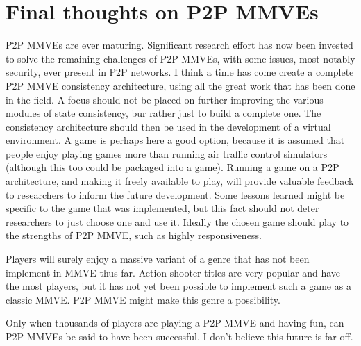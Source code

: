 \section{Final thoughts on P2P MMVEs}

P2P MMVEs are ever maturing. Significant research effort has now been invested to solve the remaining challenges of P2P MMVEs, with some issues, most notably security, ever present in P2P networks. I think a time has come create a complete P2P MMVE consistency architecture, using all the great work that has been done in the field. A focus should not be placed on further improving the various modules of state consistency, bur rather just to build a complete one. 
The consistency architecture should then be used in the development of a virtual environment. A game is perhaps here a good option, because it is assumed that people enjoy playing games more than running air traffic control simulators (although this too could be packaged into a game). Running a game on a P2P architecture, and making it freely available to play, will provide valuable feedback to researchers to inform the future development. Some lessons learned might be specific to the game that was implemented, but this fact should not deter researchers to just choose one and use it. Ideally the chosen game should play to the strengths of P2P MMVE, such as highly responsiveness.

Players will surely enjoy a massive variant of a genre that has not been implement in MMVE thus far. Action shooter titles are very popular and have the most players, but it has not yet been possible to implement such a game as a classic MMVE. P2P MMVE might make this genre a possibility.

Only when thousands of players are playing a P2P MMVE and having fun, can P2P MMVEs be said to have been successful. I don't believe this future is far off.